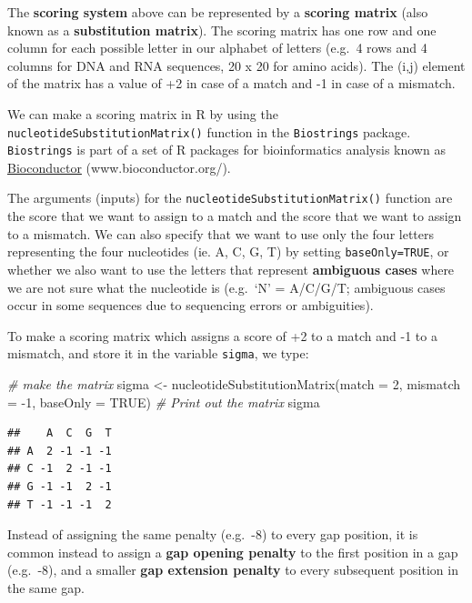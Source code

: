 \documentclass[
]{book}
\newenvironment{Shaded}{\begin{snugshade}}{\end{snugshade}}
\newcommand{\AttributeTok}[1]{\textcolor[rgb]{0.77,0.63,0.00}{#1}}
\newcommand{\CommentTok}[1]{\textcolor[rgb]{0.56,0.35,0.01}{\textit{#1}}}
\newcommand{\ConstantTok}[1]{\textcolor[rgb]{0.00,0.00,0.00}{#1}}
\newcommand{\DecValTok}[1]{\textcolor[rgb]{0.00,0.00,0.81}{#1}}
\newcommand{\FunctionTok}[1]{\textcolor[rgb]{0.00,0.00,0.00}{#1}}
\newcommand{\NormalTok}[1]{#1}
\newcommand{\OtherTok}[1]{\textcolor[rgb]{0.56,0.35,0.01}{#1}}
\newcommand{\SpecialCharTok}[1]{\textcolor[rgb]{0.00,0.00,0.00}{#1}}
\begin{document}
The \textbf{scoring system} above can be represented by a \textbf{scoring matrix} (also known as a \textbf{substitution matrix}). The scoring matrix has one row and one column for each possible letter in our alphabet of letters (e.g.~4 rows and 4 columns for DNA and RNA sequences, 20 x 20 for amino acids). The (i,j) element of the matrix has a value of +2 in case of a match and -1 in case of a mismatch.

We can make a scoring matrix in R by using the \texttt{nucleotideSubstitutionMatrix()} function in the \texttt{Biostrings} package. \texttt{Biostrings} is part of a set of R packages for bioinformatics analysis known as \href{www.bioconductor.org/}{Bioconductor} (www.bioconductor.org/).

The arguments (inputs) for the \texttt{nucleotideSubstitutionMatrix()} function are the score that we want to assign to a match and the score that we want to assign to a mismatch. We can also specify that we want to use only the four letters representing the four nucleotides (ie. A, C, G, T) by setting \texttt{baseOnly=TRUE}, or whether we also want to use the letters that represent \textbf{ambiguous cases} where we are not sure what the nucleotide is (e.g.~`N' = A/C/G/T; ambiguous cases occur in some sequences due to sequencing errors or ambiguities).

To make a scoring matrix which assigns a score of +2 to a match and -1 to a mismatch, and store it in the variable \texttt{sigma}, we type:

\begin{Shaded}
\begin{Highlighting}[]
\CommentTok{\# make the matrix}
\NormalTok{sigma }\OtherTok{\textless{}{-}} \FunctionTok{nucleotideSubstitutionMatrix}\NormalTok{(}\AttributeTok{match =} \DecValTok{2}\NormalTok{, }
                                      \AttributeTok{mismatch =} \SpecialCharTok{{-}}\DecValTok{1}\NormalTok{, }
                                      \AttributeTok{baseOnly =} \ConstantTok{TRUE}\NormalTok{)}
\CommentTok{\# Print out the matrix}
\NormalTok{sigma }
\end{Highlighting}
\end{Shaded}

\begin{verbatim}
##    A  C  G  T
## A  2 -1 -1 -1
## C -1  2 -1 -1
## G -1 -1  2 -1
## T -1 -1 -1  2
\end{verbatim}

Instead of assigning the same penalty (e.g.~-8) to every gap position, it is common instead to assign a \textbf{gap opening penalty} to the first position in a gap (e.g.~-8), and a smaller \textbf{gap extension penalty} to every subsequent position in the same gap.
\end{document}
